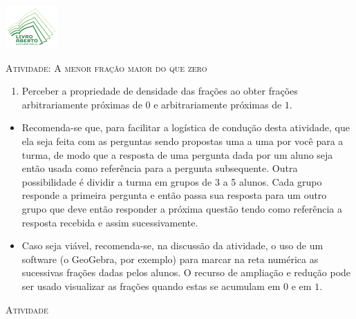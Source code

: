 \documentclass[10 pt,usenames,dvipsnames, oneside]{article}
\begin{document}
\begin{center}
  \begin{minipage}[l]{3cm}
\includegraphics[width=2cm]{../../../Figuras/logo}       
\end{minipage}\hfill
\begin{minipage}[r]{.8\textwidth}
 {\Large \scshape Atividade: A menor fração maior do que zero}  
\end{minipage}
\end{center}
\vspace{.2cm}

\ifdefined\prof
\begin{goals}
\begin{enumerate}
\item       Perceber a propriedade de densidade das frações ao obter frações
arbitrariamente próximas de       $0$       e arbitrariamente próximas de
$1$.
\end{enumerate}

\tcblower

\begin{itemize}
\item       Recomenda-se que, para facilitar a logística de condução desta
atividade, que ela seja feita com as perguntas sendo propostas uma a uma por
você para a turma, de modo que a resposta de uma pergunta dada por um aluno seja
então usada como referência para a pergunta subsequente. Outra possibilidade é
dividir a turma em grupos de 3 a 5 alunos. Cada grupo responde a primeira
pergunta e então passa sua resposta para um outro grupo que deve então responder
a próxima questão tendo como referência a resposta recebida e assim
sucessivamente.
    \item       Caso seja viável, recomenda-se, na discussão da atividade, o uso
de um software (o GeoGebra, por exemplo) para marcar na reta numérica as
sucessivas frações dadas pelos alunos. O recurso de ampliação e redução pode ser
usado visualizar as frações quando estas se acumulam em       $0$       e em
  $1$.
\end{itemize}
\end{goals}

\bigskip
\begin{center}
{\large \scshape Atividade}
\end{center}
\fi
\end{document}
